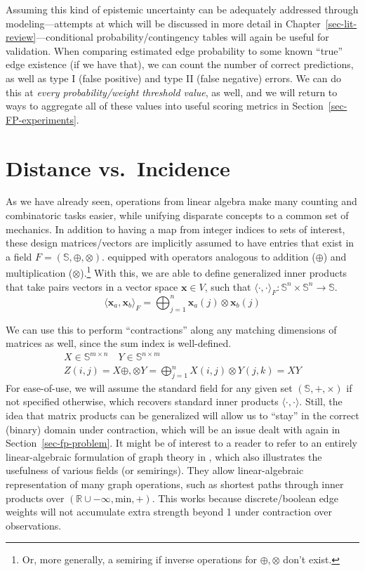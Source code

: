 \documentclass[%
	12pt,
		oneside,
		letterpaper
]{book}
\begin{document}
Assuming this kind of epistemic uncertainty can be adequately addressed
through modeling---attempts at which will be discussed in more detail in
Chapter~\ref{sec-lit-review}---conditional probability/contingency
tables will again be useful for validation. When comparing estimated
edge probability to some known ``true'' edge existence (if we have
that), we can count the number of correct predictions, as well as type I
(false positive) and type II (false negative) errors. We can do this at
\emph{every probability/weight threshold value}, as well, and we will
return to ways to aggregate all of these values into useful scoring
metrics in Section~\ref{sec-FP-experiments}.

\section{Distance vs.~Incidence}\label{sec-products}

As we have already seen, operations from linear algebra make many
counting and combinatoric tasks easier, while unifying disparate
concepts to a common set of mechanics. In addition to having a map from
integer indices to sets of interest, these design matrices/vectors are
implicitly assumed to have entries that exist in a field
\(F=(\mathbb{S},\oplus,\otimes)\). equipped with operators analogous to
addition (\(\oplus\)) and multiplication (\(\otimes\)).\footnote{ Or,
  more generally, a semiring if inverse operations for
  \(\oplus,\otimes\) don't exist.} With this, we are able to define
generalized inner products that take pairs vectors in a vector space
\(\mathbf{x}\in V\), such that
\(\langle\cdot,\cdot\rangle_F:\mathbb{S}^n\times \mathbb{S}^n\rightarrow \mathbb{S}\).
\[
\langle\mathbf{x}_a,\mathbf{x}_b\rangle_{F} = \bigoplus_{j=1}^n \mathbf{x}_a(j)\otimes\mathbf{x}_b(j)
\]

We can use this to perform ``contractions'' along any matching
dimensions of matrices as well, since the sum index is well-defined. \[
\begin{aligned}
X\in\mathbb{S}^{m\times n}\quad Y\in\mathbb{S}^{n\times m} \\
Z(i,j)=X\oplus,\otimes Y = \bigoplus_{j=1}^{n} X(i,j) \otimes Y(j,k) = XY
\end{aligned}
\] For ease-of-use, we will assume the standard field for any given set
\((\mathbb{S},+,\times)\) if not specified otherwise, which recovers
standard inner products \(\langle\cdot,\cdot\rangle\). Still, the idea
that matrix products can be generalized will allow us to ``stay'' in the
correct (binary) domain under contraction, which will be an issue dealt
with again in Section~\ref{sec-fp-problem}. It might be of interest to a
reader to refer to an entirely linear-algebraic formulation of graph
theory in \textcite{MathematicalfoundationsGraphBLAS_Kepner2016}, which
also illustrates the usefulness of various fields (or semirings). They
allow linear-algebraic representation of many graph operations, such as
shortest paths through inner products over
\((\mathbb{R}\cup -\infty,\textrm{min}, +)\). This works because
discrete/boolean edge weights will not accumulate extra strength beyond
1 under contraction over observations.
\end{document}
